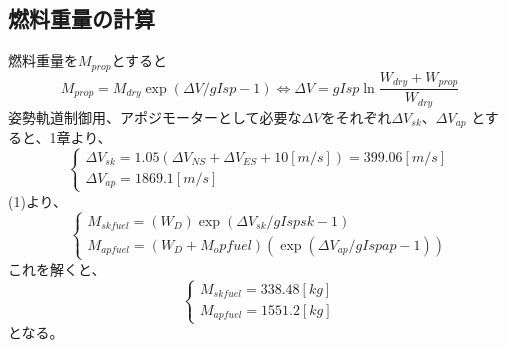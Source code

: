\documentclass[15pt,uplatex,dvipdfmx]{jsarticle}
\begin{document}
 \subsection{燃料重量の計算}
 燃料重量を$M_{prop}$とすると
 \begin{equation}
   M_{prop} = M_{dry} \exp ( \Delta V/gIsp - 1)
   \Leftrightarrow \Delta V = gIsp \ln{\frac{W_{dry} + W_{prop}}{W_{dry}}}
 \end{equation}
姿勢軌道制御用、アポジモーターとして必要な$\Delta V$をそれぞれ$\Delta V_{sk}、\Delta V_{ap}$
とすると、1章より、
\begin{equation}
  \begin{cases}
    \Delta V_{sk} = 1.05(\Delta V_{NS} + \Delta V_{ES} + 10[m/s]) = 399.06[m/s] \\
    \Delta V_{ap} = 1869.1[m/s]
  \end{cases}
\end{equation}
(1)より、
\begin{equation}
  \begin{cases}
    M_{skfuel} = (W_D) \exp ( \Delta V_{sk}/gIspsk - 1) \\
    M_{apfuel} = (W_D + M_opfuel)(\exp ( \Delta V_{ap}/gIspap - 1))
  \end{cases}
\end{equation}
これを解くと、
\begin{equation}
  \begin{cases}
    M_{skfuel} = 338.48[kg] \\
    M_{apfuel} = 1551.2[kg]
  \end{cases}
\end{equation}
となる。
\end{document}
